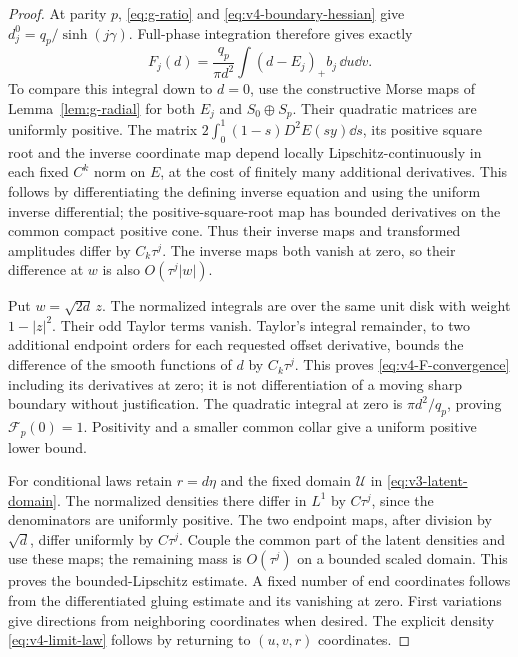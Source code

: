 \begin{proof}
At parity $p$, \eqref{eq:g-ratio} and
\eqref{eq:v4-boundary-hessian} give $d_j^0=q_p/\sinh(j\gamma)$.
Full-phase integration therefore gives exactly
\[
 F_j(d)=\frac{q_p}{\pi d^2}\int(d-E_j)_+b_j\,\dd u\dd v.
\]
To compare this integral down to $d=0$, use the constructive Morse
maps of Lemma~\ref{lem:g-radial} for both $E_j$ and $S_0\oplus S_p$.
Their quadratic matrices are uniformly positive. The matrix
$2\int_0^1(1-s)D^2E(sy)\dd s$, its positive square root and the inverse
coordinate map depend locally Lipschitz-continuously in each fixed
$C^k$ norm on $E$, at the cost of finitely many additional derivatives.
This follows by differentiating the defining inverse equation and
using the uniform inverse differential; the positive-square-root
map has bounded derivatives on the common compact positive cone.
Thus their inverse maps and transformed amplitudes differ by
$C_k\tau^j$. The inverse maps both vanish at zero, so their difference
at $w$ is also $O(\tau^j|w|)$.

Put $w=\sqrt{2d}\,z$. The normalized integrals are over the same unit
disk with weight $1-|z|^2$. Their odd Taylor terms vanish. Taylor's
integral remainder, to two additional endpoint orders for each requested
offset derivative, bounds the difference of the smooth functions of
$d$ by $C_k\tau^j$. This proves \eqref{eq:v4-F-convergence} including
its derivatives at zero; it is not differentiation of a moving sharp
boundary without justification. The quadratic integral at zero is
$\pi d^2/q_p$, proving $\mathcal F_p(0)=1$. Positivity and a smaller
common collar give a uniform positive lower bound.

For conditional laws retain $r=d\eta$ and the fixed domain
$\mathcal U$ in \eqref{eq:v3-latent-domain}. The normalized densities
there differ in $L^1$ by $C\tau^j$, since the denominators are uniformly
positive. The two endpoint maps, after division by $\sqrt d$, differ
uniformly by $C\tau^j$. Couple the common part of the latent densities
and use these maps; the remaining mass is $O(\tau^j)$ on a bounded
scaled domain. This proves the bounded-Lipschitz estimate. A fixed
number of end coordinates follows from the differentiated gluing
estimate and its vanishing at zero. First variations give directions
from neighboring coordinates when desired. The explicit density
\eqref{eq:v4-limit-law} follows by returning to $(u,v,r)$ coordinates.
\end{proof}

